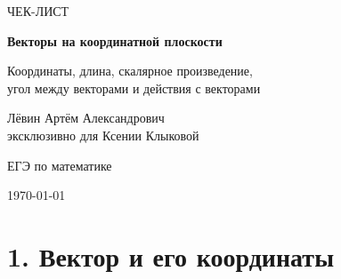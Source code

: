 \documentclass[a4paper,12pt]{article}
\begin{document}

\begin{titlepage}
\thispagestyle{empty}

\begin{center}

\vspace*{2.3cm}

{\color{darkaccent}\Large ЧЕК-ЛИСТ}

\vspace{0.6cm}

{\Huge\bfseries
Векторы на координатной плоскости
}

\vspace{0.55cm}

{\Large
Координаты, длина, скалярное произведение,\\
угол между векторами и действия с векторами
}

\vspace{2.2cm}

{\large
Лёвин Артём Александрович\\[0.25cm]
эксклюзивно для Ксении Клыковой
}

\vspace{1.3cm}

{\large ЕГЭ по математике}

\vfill

{\color{textgray}\large \today}

\vspace{1.0cm}


\vspace{0.7cm}

\end{center}

\end{titlepage}


\section*{\color{darkaccent}1. Вектор и его координаты}
\end{document}

